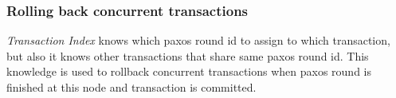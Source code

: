 









\subsubsection{Rolling back concurrent transactions}
\emph{Transaction Index} knows which paxos round id to assign to which transaction, but also it knows other transactions that share same paxos round id. This knowledge is used to rollback concurrent transactions when paxos round is finished at this node and transaction is committed.


